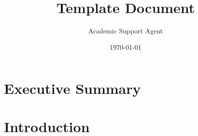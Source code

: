 \documentclass{article}
\title{Template Document}
\author{Academic Support Agent}
\date{\today}
\begin{document}
\maketitle

\renewcommand\bibname{References}


\normalsize

\newpage






\chapter*{Executive Summary}\label{chapter:Executive Summary}


\newpage







\chapter{Introduction}\label{chapter:introduction}
\setcounter{page}{0}




%



\newpage




\end{document}
